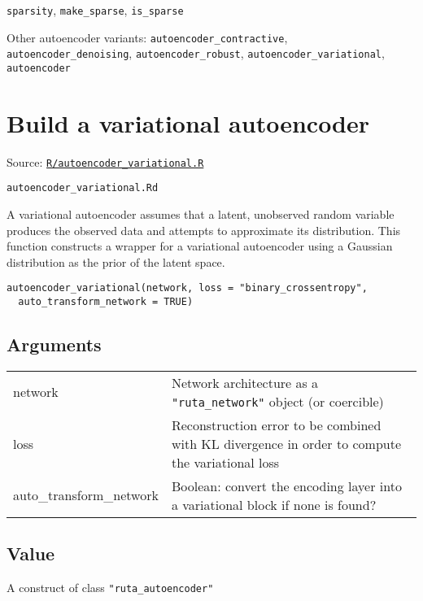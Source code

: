\texttt{sparsity}, \texttt{make\_sparse}, \texttt{is\_sparse}

Other autoencoder variants: \texttt{autoencoder\_contractive},
\texttt{autoencoder\_denoising}, \texttt{autoencoder\_robust},
\texttt{autoencoder\_variational}, \texttt{autoencoder}

\section{Build a variational
autoencoder}\label{build-a-variational-autoencoder}

Source:
\href{https://github.com/fdavidcl/ruta/blob/master/R/autoencoder_variational.R}{\texttt{R/autoencoder\_variational.R}}

\texttt{autoencoder\_variational.Rd}

A variational autoencoder assumes that a latent, unobserved random
variable produces the observed data and attempts to approximate its
distribution. This function constructs a wrapper for a variational
autoencoder using a Gaussian distribution as the prior of the latent
space.

\begin{verbatim}
autoencoder_variational(network, loss = "binary_crossentropy",
  auto_transform_network = TRUE)
\end{verbatim}

\hypertarget{arguments}{\subsection{\texorpdfstring{\protect\hyperlink{arguments}{}Arguments}{Arguments}}\label{arguments}}

\begin{longtable}[c]{@{}ll@{}}
\toprule
network & Network architecture as a \texttt{"ruta\_network"} object (or
coercible)\tabularnewline
loss & Reconstruction error to be combined with KL divergence in order
to compute the variational loss\tabularnewline
auto\_transform\_network & Boolean: convert the encoding layer into a
variational block if none is found?\tabularnewline
\bottomrule
\end{longtable}

\hypertarget{value}{\subsection{\texorpdfstring{\protect\hyperlink{value}{}Value}{Value}}\label{value}}

A construct of class \texttt{"ruta\_autoencoder"}

